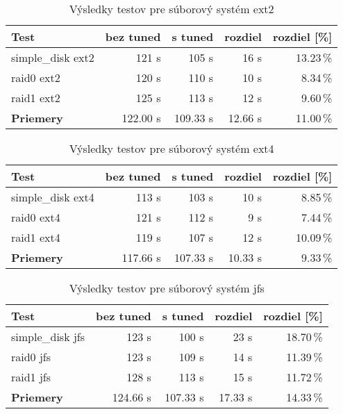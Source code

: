 \begin{table}[H]
\begin{center}
\begin{tabular}{|l|r|r|r|r|}
    \hline
    \textbf{Test} & \textbf{bez tuned} & \textbf{s tuned} & \textbf{rozdiel} & \textbf{rozdiel [\%]} \\ \hline
    simple\_disk ext2 & 121 s & 105 s & 16 s & 13.23\,\% \\
    \hline
    raid0 ext2 & 120 s & 110 s & 10 s & 8.34\,\% \\
    \hline
    raid1 ext2 & 125 s & 113 s & 12 s & 9.60\,\% \\
    \hline
    \textbf{Priemery} & 122.00 s & 109.33 s & 12.66 s & 11.00\,\% \\
    \hline
\end{tabular}
\caption{Výsledky testov pre súborový systém ext2}
\label{tab:results-ext2}
\end{center}
\end{table}

\begin{table}[H]
\begin{center}
\begin{tabular}{|l|r|r|r|r|}
    \hline
    \textbf{Test} & \textbf{bez tuned} & \textbf{s tuned} & \textbf{rozdiel} & \textbf{rozdiel [\%]} \\ \hline
    simple\_disk ext4 & 113 s & 103 s & 10 s & 8.85\,\% \\
    \hline
    raid0 ext4 & 121 s & 112 s & 9 s & 7.44\,\% \\
    \hline
    raid1 ext4 & 119 s & 107 s & 12 s & 10.09\,\% \\
    \hline
    \textbf{Priemery} & 117.66 s & 107.33 s & 10.33 s & 9.33\,\% \\
    \hline
\end{tabular}
\caption{Výsledky testov pre súborový systém ext4}
\label{tab:results-ext4}
\end{center}
\end{table}

\begin{table}[H]
\begin{center}
\begin{tabular}{|l|r|r|r|r|}
    \hline
    \textbf{Test} & \textbf{bez tuned} & \textbf{s tuned} & \textbf{rozdiel} & \textbf{rozdiel [\%]} \\ \hline
    simple\_disk jfs & 123 s & 100 s & 23 s & 18.70\,\% \\
    \hline
    raid0 jfs & 123 s & 109 s & 14 s & 11.39\,\% \\
    \hline
    raid1 jfs & 128 s & 113 s & 15 s & 11.72\,\% \\
    \hline
    \textbf{Priemery} & 124.66 s & 107.33 s & 17.33 s & 14.33\,\% \\
    \hline
\end{tabular}
\caption{Výsledky testov pre súborový systém jfs}
\label{tab:results-jfs}
\end{center}
\end{table}

